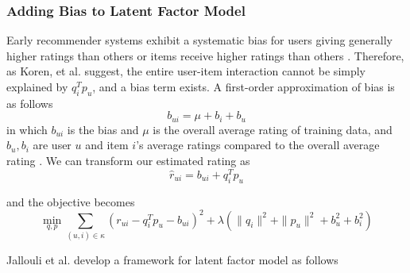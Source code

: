 \documentclass[letter paper, 11pt]{article}
\begin{document}
	 
	\subsubsection{Adding Bias to Latent Factor Model}
	Early recommender systems exhibit a systematic bias for users giving generally higher ratings than others or items receive higher ratings than others \cite{MFinRS}. Therefore, as Koren, et al. suggest, the entire user-item interaction cannot be simply explained by $q_i^T  p_u$, and a bias term exists. A first-order approximation of bias is as follows \cite{MFinRS}
	\begin{equation}
		b_{ui} = \mu + b_i + b_u
	\end{equation}
	in which $b_{ui}$ is the bias and $\mu$ is the overall average rating of training data, and $b_u, b_i$ are user $u$ and item $i$'s average ratings compared to the overall average rating \cite{MFinRS}. We can transform our estimated rating as 
	\begin{equation}
		\hat{r}_{ui} = b_{ui} + q_i^T  p_u 
	\end{equation}
	
	and the objective becomes
	\begin{equation}
		\min_{q, p} \sum_{(u, i) \in \kappa} (r_{ui} - q_i^T p_u - b_{ui})^2 + \lambda(\|q_i\|^2 + \|p_u\|^2 + b_u^2 + b_i^2)
	\end{equation}
	
	Jallouli et al. develop a framework for latent factor model \cite{latentFactor-RS} as follows
	
\end{document}
